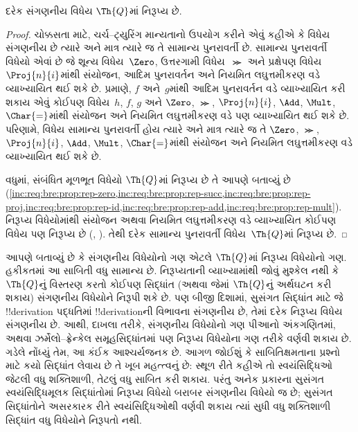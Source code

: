 \documentclass[../../../include/open-logic-section]{subfiles}
\begin{document}

\begin{thm}
દરેક સંગણનીય વિધેય
$\Th{Q}$માં નિરૂપ્ય છે.
\end{thm}

\begin{proof}
ચોક્કસતા માટે, ચર્ચ--ટ્યુરિંગ
માન્યતાનો ઉપયોગ કરીને એવું
કહીએ કે વિધેય સંગણનીય છે
ત્યારે અને માત્ર ત્યારે જ
તે સામાન્ય પુનરાવર્તી છે.
સામાન્ય પુનરાવર્તી વિધેયો
એવાં છે જે શૂન્ય વિધેય~$\Zero$,
ઉત્તરગામી વિધેય~$\Succ$ અને
પ્રક્ષેપણ વિધેય~$\Proj{n}{i}$માંથી
સંયોજન, આદિમ પુનરાવર્તન અને
નિયમિત લઘુત્તમીકરણ વડે
વ્યાખ્યાયિત થઈ શકે છે.
 પ્રમાણે,
$f$ અને~$g$માંથી આદિમ પુનરાવર્તન વડે વ્યાખ્યાયિત
કરી શકાય એવું કોઈપણ વિધેય~$h$,
$f$, $g$ અને $\Zero$,
$\Succ$, $\Proj{n}{i}$,
$\Add$, $\Mult$, $\Char{=}$માંથી
સંયોજન અને નિયમિત લઘુત્તમીકરણ
વડે પણ વ્યાખ્યાયિત થઈ શકે છે.
પરિણામે, વિધેય સામાન્ય પુનરાવર્તી
હોય ત્યારે અને માત્ર ત્યારે જ
તે $\Zero$, $\Succ$,
$\Proj{n}{i}$, $\Add$,
$\Mult$, $\Char{=}$માંથી
સંયોજન અને નિયમિત લઘુત્તમીકરણ
વડે વ્યાખ્યાયિત થઈ શકે છે.

વધુમાં, સંબંધિત મૂળભૂત વિધેયો
$\Th{Q}$માં નિરૂપ્ય છે તે આપણે
બતાવ્યું છે
(\cref{inc:req:bre:prop:rep-zero,inc:req:bre:prop:rep-succ,inc:req:bre:prop:rep-proj,inc:req:bre:prop:rep-id,inc:req:bre:prop:rep-add,inc:req:bre:prop:rep-mult}).
નિરૂપ્ય વિધેયોમાંથી સંયોજન
અથવા નિયમિત લઘુત્તમીકરણ
વડે વ્યાખ્યાયિત કોઈપણ વિધેય
પણ નિરૂપ્ય છે
(,
).
તેથી દરેક સામાન્ય પુનરાવર્તી
વિધેય~$\Th{Q}$માં નિરૂપ્ય છે.
\end{proof}

\begin{explain}
આપણે બતાવ્યું છે કે સંગણનીય
વિધેયોનો ગણ એટલે $\Th{Q}$માં
નિરૂપ્ય વિધેયોનો ગણ.
હકીકતમાં આ સાબિતી વધુ સામાન્ય
છે. નિરૂપ્યતાની વ્યાખ્યામાંથી
જોવું મુશ્કેલ નથી કે
$\Th{Q}$નું વિસ્તરણ કરતો
કોઈપણ સિદ્ધાંત (અથવા જેમાં
$\Th{Q}$નું અર્થઘટન કરી શકાય)
સંગણનીય વિધેયોને નિરૂપી શકે છે.
પણ બીજી દિશામાં, સુસંગત સિદ્ધાંત માટે જે
!!{derivation} પદ્ધતિમાં
!!{derivation}ની વિભાવના સંગણનીય
છે, તેમાં દરેક નિરૂપ્ય વિધેય
સંગણનીય છે. આથી, દાખલા તરીકે,
સંગણનીય વિધેયોનો ગણ પીઆનો
અંકગણિતમાં, અથવા ઝર્મેલો--ફ્રેન્કેલ
સમૂહસિદ્ધાંતમાં પણ નિરૂપ્ય
વિધેયોના ગણ તરીકે વર્ણવી શકાય
છે. ગડેલે નોંધ્યું તેમ, આ કંઈક
આશ્ચર્યજનક છે. આગળ જોઈશું
કે સાબિતિક્ષમતાના પ્રશ્નો માટે
કયો સિદ્ધાંત લેવાય છે તે ખૂબ
મહત્ત્વનું છે: સ્થૂળ રીતે કહીએ
તો સ્વયંસિદ્ધિઓ જેટલી વધુ
શક્તિશાળી, તેટલું વધુ સાબિત
કરી શકાય. પરંતુ અનેક પ્રકારના સુસંગત
સ્વયંસિદ્ધિમૂલક સિદ્ધાંતોમાં
નિરૂપ્ય વિધેયો બરાબર સંગણનીય
વિધેયો જ છે; સુસંગત સિદ્ધાંતોને
અસરકારક રીતે સ્વયંસિદ્ધિઓથી વર્ણવી શકાય
ત્યાં સુધી વધુ શક્તિશાળી
સિદ્ધાંત વધુ વિધેયોને નિરૂપતો
નથી.
\end{explain}
\end{document}
